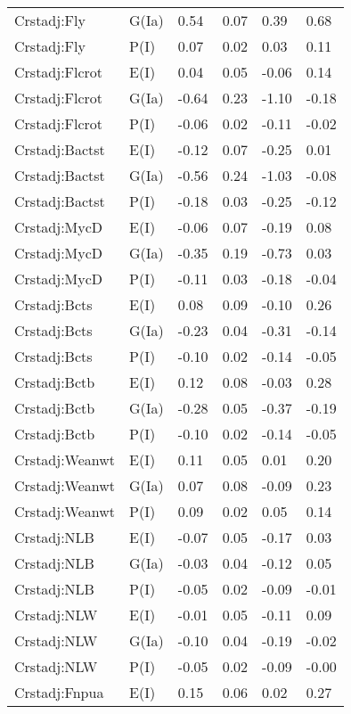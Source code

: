 \begin{center}
\begin{longtable}{|p{1.1in}|p{0.7in}|p{0.7in}|p{0.6in}|p{0.6in}|p{0.6in}|}
  Crstadj:Fly & G(Ia) & 0.54 & 0.07 & 0.39 & 0.68 \\ 
  Crstadj:Fly & P(I) & 0.07 & 0.02 & 0.03 & 0.11 \\ 
  Crstadj:Flcrot & E(I) & 0.04 & 0.05 & -0.06 & 0.14 \\ 
  Crstadj:Flcrot & G(Ia) & -0.64 & 0.23 & -1.10 & -0.18 \\ 
  Crstadj:Flcrot & P(I) & -0.06 & 0.02 & -0.11 & -0.02 \\ 
  Crstadj:Bactst & E(I) & -0.12 & 0.07 & -0.25 & 0.01 \\ 
  Crstadj:Bactst & G(Ia) & -0.56 & 0.24 & -1.03 & -0.08 \\ 
  Crstadj:Bactst & P(I) & -0.18 & 0.03 & -0.25 & -0.12 \\ 
  Crstadj:MycD & E(I) & -0.06 & 0.07 & -0.19 & 0.08 \\ 
  Crstadj:MycD & G(Ia) & -0.35 & 0.19 & -0.73 & 0.03 \\ 
  Crstadj:MycD & P(I) & -0.11 & 0.03 & -0.18 & -0.04 \\ 
  Crstadj:Bcts & E(I) & 0.08 & 0.09 & -0.10 & 0.26 \\ 
  Crstadj:Bcts & G(Ia) & -0.23 & 0.04 & -0.31 & -0.14 \\ 
  Crstadj:Bcts & P(I) & -0.10 & 0.02 & -0.14 & -0.05 \\ 
  Crstadj:Bctb & E(I) & 0.12 & 0.08 & -0.03 & 0.28 \\ 
  Crstadj:Bctb & G(Ia) & -0.28 & 0.05 & -0.37 & -0.19 \\ 
  Crstadj:Bctb & P(I) & -0.10 & 0.02 & -0.14 & -0.05 \\ 
  Crstadj:Weanwt & E(I) & 0.11 & 0.05 & 0.01 & 0.20 \\ 
  Crstadj:Weanwt & G(Ia) & 0.07 & 0.08 & -0.09 & 0.23 \\ 
  Crstadj:Weanwt & P(I) & 0.09 & 0.02 & 0.05 & 0.14 \\ 
  Crstadj:NLB & E(I) & -0.07 & 0.05 & -0.17 & 0.03 \\ 
  Crstadj:NLB & G(Ia) & -0.03 & 0.04 & -0.12 & 0.05 \\ 
  Crstadj:NLB & P(I) & -0.05 & 0.02 & -0.09 & -0.01 \\ 
  Crstadj:NLW & E(I) & -0.01 & 0.05 & -0.11 & 0.09 \\ 
  Crstadj:NLW & G(Ia) & -0.10 & 0.04 & -0.19 & -0.02 \\ 
  Crstadj:NLW & P(I) & -0.05 & 0.02 & -0.09 & -0.00 \\ 
  Crstadj:Fnpua & E(I) & 0.15 & 0.06 & 0.02 & 0.27 \\ 

\end{longtable}
\end{center}
